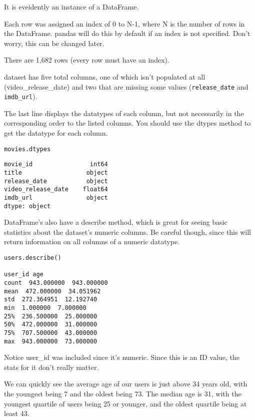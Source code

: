 \documentclass[]{article}
\begin{document}
 
\item It is eveidently an instance of a DataFrame.
\item Each row was assigned an index of 0 to N-1, where N is the number of rows in the DataFrame. pandas will do this by default if an index is not specified. Don't worry, this can be changed later.
\item There are 1,682 rows (every row must have an index).
\item  dataset has five total columns, one of which isn't populated at all (video\_release\_date) and two that are missing some values (\texttt{release\_date} and \texttt{imdb\_url}).
\item The last line displays the datatypes of each column, but not necessarily in the corresponding order to the listed columns. You should use the dtypes method to get the datatype for each column.
 

\begin{verbatim}
movies.dtypes
\end{verbatim}
\begin{framed}
\begin{verbatim}
movie_id                int64
title                  object
release_date           object
video_release_date    float64
imdb_url               object
dtype: object
\end{verbatim}
\end{framed}
DataFrame's also have a describe method, which is great for seeing basic statistics about the dataset's numeric columns. Be careful though, since this will return information on all columns of a numeric datatype.

\begin{verbatim}
users.describe()

user_id age
count  943.000000  943.000000
mean  472.000000  34.051962
std  272.364951  12.192740
min  1.000000  7.000000
25%  236.500000  25.000000
50%  472.000000  31.000000
75%  707.500000  43.000000
max  943.000000  73.000000
\end{verbatim}
Notice user\_id was included since it's numeric. Since this is an ID value, the stats for it don't really matter.

We can quickly see the average age of our users is just above 34 years old, with the youngest being 7 and the oldest being 73. The median age is 31, with the youngest quartile of users being 25 or younger, and the oldest quartile being at least 43.
\end{document}
